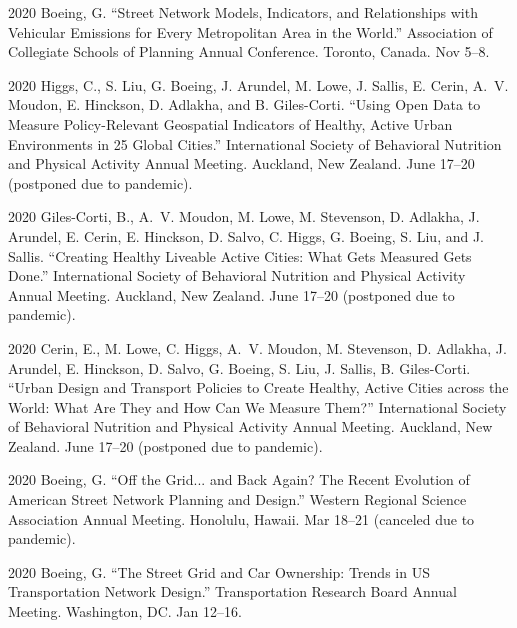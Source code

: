 \documentclass[12pt,letterpaper]{report}
\begin{document}
    \begin{tablist}

        \item[2020] \tab Boeing, G. \enquote{Street Network Models, Indicators, and Relationships with Vehicular Emissions for Every Metropolitan Area in the World.} Association of Collegiate Schools of Planning Annual Conference. Toronto, Canada. Nov 5--8.

        \item[2020] \tab Higgs, C.,  S. Liu, G. Boeing, J. Arundel, M. Lowe, J. Sallis, E. Cerin, A.~V. Moudon, E. Hinckson, D. Adlakha, and B. Giles-Corti. \enquote{Using Open Data to Measure Policy-Relevant Geospatial Indicators of Healthy, Active Urban Environments in 25 Global Cities.} International Society of Behavioral Nutrition and Physical Activity Annual Meeting. Auckland, New Zealand. June 17--20 (postponed due to pandemic).

        \item[2020] \tab Giles-Corti, B.,  A.~V. Moudon, M. Lowe, M. Stevenson, D. Adlakha, J. Arundel, E. Cerin, E. Hinckson, D. Salvo, C. Higgs, G. Boeing, S. Liu, and J. Sallis. \enquote{Creating Healthy Liveable Active Cities: What Gets Measured Gets Done.} International Society of Behavioral Nutrition and Physical Activity Annual Meeting. Auckland, New Zealand. June 17--20 (postponed due to pandemic).

        \item[2020] \tab Cerin, E., M. Lowe, C. Higgs, A.~V. Moudon, M. Stevenson, D. Adlakha, J. Arundel, E. Hinckson, D. Salvo, G. Boeing, S. Liu, J. Sallis, B. Giles-Corti. \enquote{Urban Design and Transport Policies to Create Healthy, Active Cities across the World: What Are They and How Can We Measure Them?} International Society of Behavioral Nutrition and Physical Activity Annual Meeting. Auckland, New Zealand. June 17--20 (postponed due to pandemic).

        \item[2020] \tab Boeing, G. \enquote{Off the Grid... and Back Again? The Recent Evolution of American Street Network Planning and Design.} Western Regional Science Association Annual Meeting. Honolulu, Hawaii. Mar 18--21 (canceled due to pandemic).

        \item[2020] \tab Boeing, G. \enquote{The Street Grid and Car Ownership: Trends in US Transportation Network Design.} Transportation Research Board Annual Meeting. Washington, DC. Jan 12--16.


\end{tablist}
\end{document}
